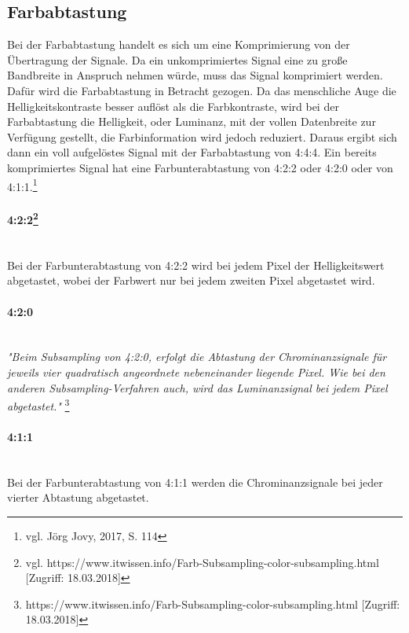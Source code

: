 \subsection{Farbabtastung}
Bei der Farbabtastung handelt es sich um eine Komprimierung von  der Übertragung der Signale. Da ein unkomprimiertes Signal eine zu große Bandbreite in Anspruch nehmen würde, muss das Signal komprimiert werden. Dafür wird die Farbabtastung in Betracht gezogen. Da das menschliche Auge die Helligkeitskontraste besser auflöst als die Farbkontraste, wird bei der Farbabtastung die Helligkeit, oder Luminanz, mit der vollen Datenbreite zur Verfügung gestellt, die Farbinformation wird jedoch reduziert. Daraus ergibt sich dann ein voll aufgelöstes Signal mit der Farbabtastung von 4:4:4. Ein bereits komprimiertes Signal hat eine Farbunterabtastung von 4:2:2 oder 4:2:0 oder von 4:1:1.\footnote{\label{}vgl. Jörg Jovy, 2017, S. 114}
\paragraph[4:2:2]{4:2:2\protect\footnote{\label{}vgl. https://www.itwissen.info/Farb-Subsampling-color-subsampling.html [Zugriff: 18.03.2018]}}
\leavevmode \\
Bei der Farbunterabtastung von 4:2:2 wird bei jedem Pixel der Helligkeitswert abgetastet, wobei der Farbwert nur bei jedem zweiten Pixel abgetastet wird. 
\paragraph{4:2:0}
\leavevmode \\
\textit{"Beim Subsampling von 4:2:0, erfolgt die Abtastung der Chrominanzsignale für jeweils vier quadratisch angeordnete nebeneinander liegende Pixel. Wie bei den anderen Subsampling-Verfahren auch, wird das Luminanzsignal bei jedem Pixel abgetastet."} \footnote{\label{}https://www.itwissen.info/Farb-Subsampling-color-subsampling.html [Zugriff: 18.03.2018]}
\paragraph{4:1:1}
\leavevmode \\
Bei der Farbunterabtastung von 4:1:1 werden die Chrominanzsignale bei jeder vierter Abtastung abgetastet.
